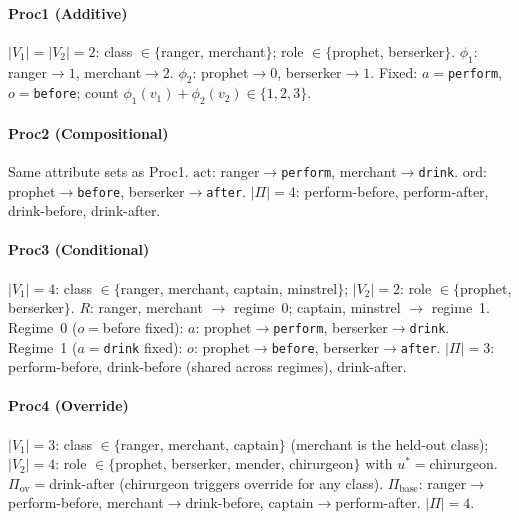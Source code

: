 \documentclass[11pt]{article}
\begin{document}
\begin{sloppypar}
\paragraph{Proc1 (Additive)}
$|V_1|{=}|V_2|{=}2$: class $\in \{$ranger, merchant$\}$; role $\in \{$prophet, berserker$\}$.
$\phi_1$: ranger$\to 1$, merchant$\to 2$.
$\phi_2$: prophet$\to 0$, berserker$\to 1$.
Fixed: $a{=}$\texttt{perform}, $o{=}$\texttt{before}; count $\phi_1(v_1)+\phi_2(v_2)\in\{1,2,3\}$.

\paragraph{Proc2 (Compositional)}
Same attribute sets as Proc1.
$\text{act}$: ranger$\to$\texttt{perform}, merchant$\to$\texttt{drink}.
$\text{ord}$: prophet$\to$\texttt{before}, berserker$\to$\texttt{after}.
$|\Pi|{=}4$: perform-before, perform-after, drink-before, drink-after.

\paragraph{Proc3 (Conditional)}
$|V_1|{=}4$: class $\in \{$ranger, merchant, captain, minstrel$\}$;
$|V_2|{=}2$: role $\in \{$prophet, berserker$\}$.
$R$: ranger, merchant $\to$ regime~0; captain, minstrel $\to$ regime~1.
Regime~0 ($o{=}$before fixed): $a$: prophet$\to$\texttt{perform}, berserker$\to$\texttt{drink}.
Regime~1 ($a{=}$\texttt{drink} fixed): $o$: prophet$\to$\texttt{before}, berserker$\to$\texttt{after}.
$|\Pi|{=}3$: perform-before, drink-before (shared across regimes), drink-after.

\paragraph{Proc4 (Override)}
$|V_1|{=}3$: class $\in \{$ranger, merchant, captain$\}$ (merchant is the held-out class);
$|V_2|{=}4$: role $\in \{$prophet, berserker, mender, chirurgeon$\}$ with $u^*{=}$chirurgeon.
$\Pi_\mathrm{ov}{=}$drink-after (chirurgeon triggers override for any class).
$\Pi_\mathrm{base}$: ranger$\to$perform-before, merchant$\to$drink-before, captain$\to$perform-after.
$|\Pi|{=}4$.
\end{sloppypar}
\end{document}
